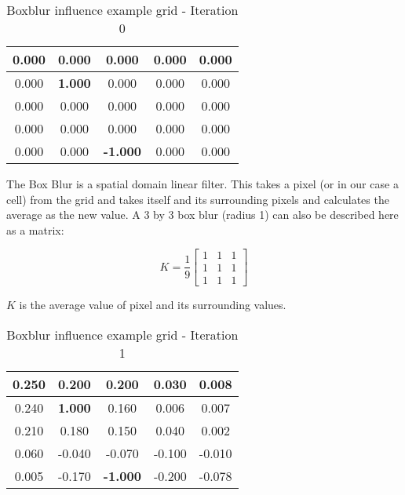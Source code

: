 \documentclass[]{report}
\begin{document}
\begin{table}[H]
	\centering
	\begin{tabular}{|c|c|c|c|c|}
		\hline
		0.000 & 0.000 & 0.000 & 0.000 & 0.000\\
		\hline
		0.000 & \textbf{1.000} & 0.000 & 0.000 & 0.000\\
		\hline
		0.000 & 0.000 & 0.000 & 0.000 & 0.000\\
		\hline
		0.000 & 0.000 & 0.000 & 0.000 & 0.000\\
		\hline
		0.000 & 0.000 & \textbf{-1.000} & 0.000 & 0.000\\
		\hline
		
	\end{tabular}
	\caption{Boxblur influence example grid - Iteration 0}
	\label{tab:Boxblur grid Iteration 0}
\end{table}

The Box Blur is a spatial domain linear filter. This takes a pixel (or in our case a cell) from the grid and takes itself and its surrounding pixels and calculates the average as the new value. A 3 by 3 box blur (radius 1) can also be described here as a matrix:

\[K = \frac{1}{9}\begin{bmatrix} 1 & 1 & 1\\ 1 & 1 & 1\\ 1 & 1 & 1 \end{bmatrix}\]

$K$ is the average value of pixel and its surrounding values.\citep{boxblur}

\begin{table}[H]
	\centering
	\begin{tabular}{|c|c|c|c|c|}
		\hline
		0.250 & 0.200 & 0.200 & 0.030 & 0.008\\
		\hline
		0.240 & \textbf{1.000} & 0.160 & 0.006 & 0.007\\
		\hline
		0.210 & 0.180 & 0.150 & 0.040 & 0.002\\
		\hline
		0.060 & -0.040 & -0.070 & -0.100 & -0.010\\
		\hline
		0.005 & -0.170 & \textbf{-1.000} & -0.200 & -0.078\\
		\hline
		
	\end{tabular}
	\caption{Boxblur influence example grid - Iteration 1}
	\label{tab:Boxblur grid Iteration 1}
\end{table}
\end{document}
